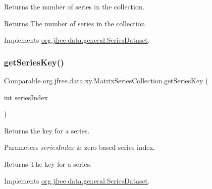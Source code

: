 Returns the number of series in the collection.

\begin{DoxyReturn}{Returns}
The number of series in the collection. 
\end{DoxyReturn}


Implements \mbox{\hyperlink{interfaceorg_1_1jfree_1_1data_1_1general_1_1_series_dataset_a84fe822f5918f941d9de1ed1b73c9f58}{org.\+jfree.\+data.\+general.\+Series\+Dataset}}.

\mbox{\label{classorg_1_1jfree_1_1data_1_1xy_1_1_matrix_series_collection_adb198be708672b9d161209f0ef827be0}} 
\subsubsection{\texorpdfstring{get\+Series\+Key()}{getSeriesKey()}}
{\footnotesize\ttfamily Comparable org.\+jfree.\+data.\+xy.\+Matrix\+Series\+Collection.\+get\+Series\+Key (\begin{DoxyParamCaption}\item[{int}]{series\+Index }\end{DoxyParamCaption})}

Returns the key for a series.


\begin{DoxyParams}{Parameters}
{\em series\+Index} & zero-\/based series index.\\
\hline
\end{DoxyParams}
\begin{DoxyReturn}{Returns}
The key for a series. 
\end{DoxyReturn}


Implements \mbox{\hyperlink{interfaceorg_1_1jfree_1_1data_1_1general_1_1_series_dataset_a60488892b2314a05a012999e26a74178}{org.\+jfree.\+data.\+general.\+Series\+Dataset}}.

\mbox{\label{classorg_1_1jfree_1_1data_1_1xy_1_1_matrix_series_collection_a3fbbf6d5deb2ec56a7778c3053da5ead}} 

